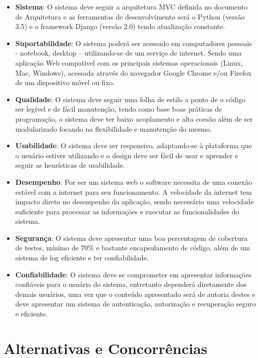 \begin{itemize}
  \item \textbf{Sistema}: O sistema deve seguir a arquitetura MVC definida no documento de Arquitetura e as ferramentas
    de desenvolvimento será o Python (versão 3.5) e o framework Django (versão 2.0) tendo atualização constante.
  \item \textbf{Suportabilidade}: O sistema poderá ser acessado em computadores pessoais - notebook, desktop – utilizando-se de um serviço de internet. Sendo uma aplicação Web compatível com os principais sistemas operacionais (Linux, Mac, Windows), acessada através do navegador Google Chrome e/ou Firefox de um dispositivo móvel ou fixo.
  \item \textbf{Qualidade}: O sistema deve seguir uma folha de estilo a ponto de o código ser legível e de fácil manutenção, tendo como base boas práticas de programação, o sistema deve ter baixo acoplamento e alta coesão além de ser modularizado focando na flexibilidade e manutenção do mesmo.
  \item \textbf{Usabilidade}: O sistema deve ser responsivo, adaptando-se à plataforma que o usuário estiver utilizando e o design deve ser fácil de usar e aprender e seguir as heurísticas de usabilidade.
  \item \textbf{Desempenho}: Por ser um sistema web o software necessita de uma conexão estável com a internet para seu funcionamento. A velocidade da internet tem impacto direto no desempenho da aplicação, sendo necessário uma velocidade suficiente para processar as informações e executar as funcionalidades do sistema.
  \item \textbf{Segurança}: O sistema deve apresentar uma boa percentagem de cobertura de testes, mínimo de 70\% e bastante encapsulamento de código, além de um sistema de log eficiente e ter confiabilidade.
  \item \textbf{Confiabilidade}: O sistema deve se comprometer em apresentar informações confiáveis para o usuário do sistema, entretanto dependerá diretamente dos demais usuários, uma vez que o conteúdo apresentado será de autoria destes e deve apresentar um sistema de autenticação, autorização e recuperação seguro e eficiente.
\end{itemize}

\section{Alternativas e Concorrências}

